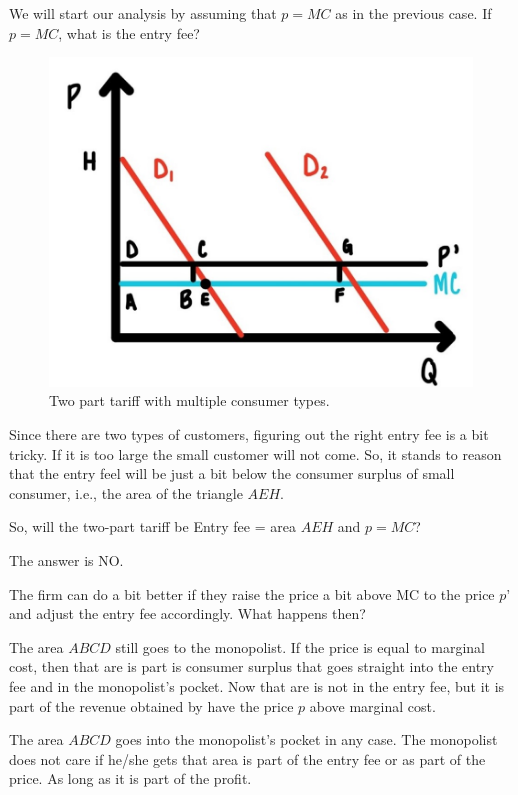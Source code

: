 \documentclass[
]{book}
\begin{document}
We will start our analysis by assuming that \(p = MC\) as in the previous case. If \(p = MC\), what is the entry fee?

\begin{figure}

{\centering \includegraphics[width=0.75\linewidth]{img/monopoly/fig10} 

}

\caption{Two part tariff with multiple consumer types.}\label{fig:monopoly10}
\end{figure}

Since there are two types of customers, figuring out the right entry fee is a bit tricky. If it is too large the small customer will not come. So, it stands to reason that the entry feel will be just a bit below the consumer surplus of small consumer, i.e., the area of the triangle \(AEH\).

So, will the two-part tariff be Entry fee = area \(AEH\) and \(p=MC\)?

The answer is NO.

The firm can do a bit better if they raise the price a bit above MC to the price \(p’\) and adjust the entry fee accordingly. What happens then?

The area \(ABCD\) still goes to the monopolist. If the price is equal to marginal cost, then that are is part is consumer surplus that goes straight into the entry fee and in the monopolist's pocket. Now that are is not in the entry fee, but it is part of the revenue obtained by have the price \(p\) above marginal cost.

The area \(ABCD\) goes into the monopolist's pocket in any case. The monopolist does not care if he/she gets that area is part of the entry fee or as part of the price. As long as it is part of the profit.
\end{document}
